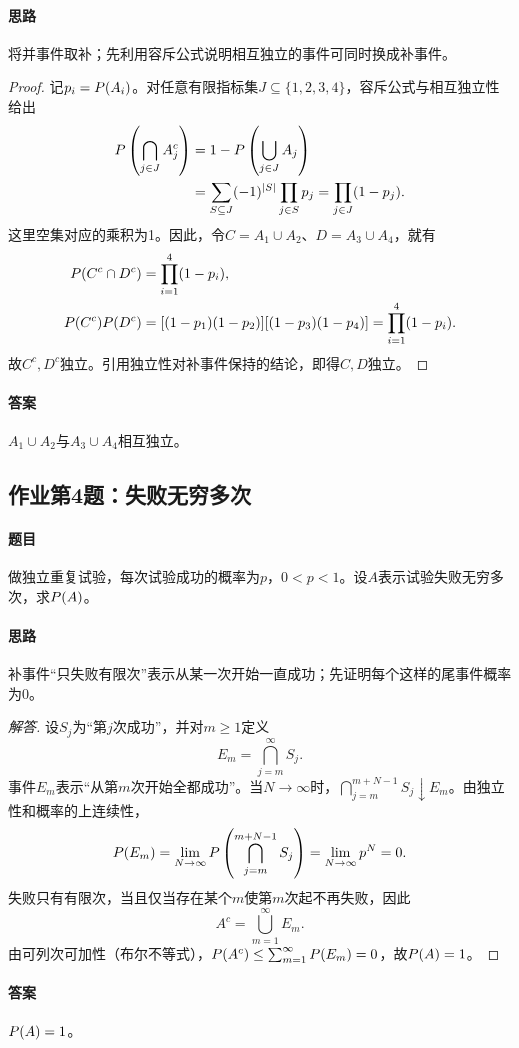 \paragraph{思路}将并事件取补；先利用容斥公式说明相互独立的事件可同时换成补事件。
\begin{proof}
记$p_i=\P(A_i)$。对任意有限指标集$J\subseteq\{1,2,3,4\}$，容斥公式与相互独立性给出
\begin{align*}
\P\left(\bigcap_{j\in J}A_j^c\right)
&=1-\P\left(\bigcup_{j\in J}A_j\right)\\
&=\sum_{S\subseteq J}(-1)^{|S|}\prod_{j\in S}p_j
=\prod_{j\in J}(1-p_j).
\end{align*}
这里空集对应的乘积为1。因此，令$C=A_1\cup A_2$、$D=A_3\cup A_4$，就有
\begin{align*}
\P(C^c\cap D^c)&=\prod_{i=1}^4(1-p_i),\\
\P(C^c)\P(D^c)&=[(1-p_1)(1-p_2)][(1-p_3)(1-p_4)]
=\prod_{i=1}^4(1-p_i).
\end{align*}
故$C^c,D^c$独立。引用独立性对补事件保持的结论，即得$C,D$独立。
\end{proof}
\paragraph{答案}$A_1\cup A_2$与$A_3\cup A_4$相互独立。

\subsection{作业第4题：失败无穷多次}
\label{ex:w04-h4}
\paragraph{题目}
做独立重复试验，每次试验成功的概率为$p$，$0<p<1$。设$A$表示试验失败无穷多次，求$\P(A)$。
\paragraph{思路}补事件“只失败有限次”表示从某一次开始一直成功；先证明每个这样的尾事件概率为0。
\begin{proof}[解答]
设$S_j$为“第$j$次成功”，并对$m\geq1$定义
\[
E_m=\bigcap_{j=m}^\infty S_j.
\]
事件$E_m$表示“从第$m$次开始全都成功”。当$N\to\infty$时，$\bigcap_{j=m}^{m+N-1}S_j\downarrow E_m$。由独立性和概率的上连续性，
\[
\P(E_m)=\lim_{N\to\infty}\P\left(\bigcap_{j=m}^{m+N-1}S_j\right)
=\lim_{N\to\infty}p^N=0.
\]
失败只有有限次，当且仅当存在某个$m$使第$m$次起不再失败，因此
\[
A^c=\bigcup_{m=1}^\infty E_m.
\]
由可列次可加性（布尔不等式），$\P(A^c)\leq\sum_{m=1}^\infty\P(E_m)=0$，故$\P(A)=1$。
\end{proof}
\paragraph{答案}$\P(A)=1$。
